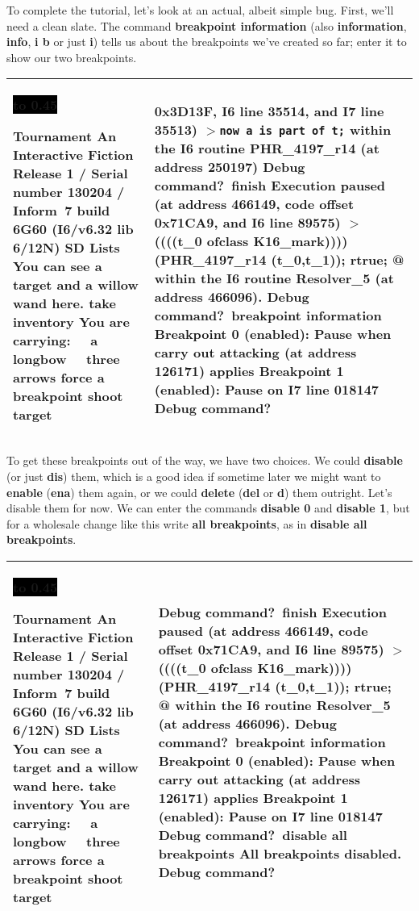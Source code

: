 \documentclass{book}
\newcommand{\n}{\hspace*{\fill}\newline}
\newcommand{\terp}[2]{\begin{center}\begin{tabular}{p{0.45\textwidth}|p{0.45\textwidth}}\midrule #1&#2\\\midrule\end{tabular}\end{center}}
\newcommand{\glkheading}[1]{\textbf{#1}}
\newcommand{\glkinput}[1]{\textbf{#1}}
\newcommand{\glkstatusline}[2]{\centerline{\colorbox{black}{\hbox to 0.45\textwidth{\textcolor{white}{#1\hfil #2}}}}}
\newcommand{\storyprompt}{\raisebox{1.5pt}{\(>\)}}
\newcommand{\cursor}{\raisebox{-1.5pt}{\RectangleThin}}
\newcommand{\markedindent}{\(>\)\qquad}
\begin{document}
To complete the tutorial, let's look at an actual, albeit simple bug.  First,
we'll need a clean slate.  The command \glkinput{breakpoint information} (also
\glkinput{information}, \glkinput{info}, \glkinput{i b} or just \glkinput{i})
tells us about the breakpoints we've created so far; enter it to show our two
breakpoints.

\terp{\glkstatusline{Lists}{0/2}\n
  \glkheading{Tournament}\n
  An Interactive Fiction\n
  Release 1 / Serial number 130204 / Inform~7 build 6G60 (I6/v6.32 lib 6/12N) SD\n
  \n
  \glkheading{Lists}\n
  You can see a target and a willow wand here.\n
  \n
  \storyprompt\glkinput{take inventory}\n
  You are carrying:\n
  \null\ \ a longbow\n
  \null\ \ three arrows\n
  \n
  \storyprompt\glkinput{force a breakpoint}\n
  \storyprompt\glkinput{shoot target}}{%
  0x3D13F, I6 line 35514, and I7 line 35513)\n
  \markedindent \lstinline{now a is part of t;}\n
  within the I6 routine PHR\_4197\_r14 (at address 250197)\n
  \n
  Debug command?\ \glkinput{finish}\n
  \n
  Execution paused (at address 466149, code offset 0x71CA9, and I6 line 89575)\n
  \markedindent \lstinline@if ((((t\_0 ofclass K16\_mark)))) { (PHR\_4197\_r14 (t\_0,t\_1)); rtrue; }@\n
  within the I6 routine Resolver\_5 (at address 466096).\n
  \n
  Debug command?\ \glkinput{breakpoint information}\n
  \n
  Breakpoint 0 (enabled): Pause when carry out attacking (at address 126171) applies\n
  Breakpoint 1 (enabled): Pause on I7 line 018147\n
  \n
  Debug command?\ \cursor}

To get these breakpoints out of the way, we have two choices.  We could
\glkinput{disable} (or just \glkinput{dis}) them, which is a good idea if
sometime later we might want to \glkinput{enable} (\glkinput{ena}) them again,
or we could \glkinput{delete} (\glkinput{del} or \glkinput{d}) them outright.
Let's disable them for now.  We can enter the commands \glkinput{disable 0} and
\glkinput{disable 1}, but for a wholesale change like this write \glkinput{all
  breakpoints}, as in \glkinput{disable all breakpoints}.

\terp{\glkstatusline{Lists}{0/2}\n
  \glkheading{Tournament}\n
  An Interactive Fiction\n
  Release 1 / Serial number 130204 / Inform~7 build 6G60 (I6/v6.32 lib 6/12N) SD\n
  \n
  \glkheading{Lists}\n
  You can see a target and a willow wand here.\n
  \n
  \storyprompt\glkinput{take inventory}\n
  You are carrying:\n
  \null\ \ a longbow\n
  \null\ \ three arrows\n
  \n
  \storyprompt\glkinput{force a breakpoint}\n
  \storyprompt\glkinput{shoot target}}{%
  \n
  Debug command?\ \glkinput{finish}\n
  \n
  Execution paused (at address 466149, code offset 0x71CA9, and I6 line 89575)\n
  \markedindent \lstinline@if ((((t\_0 ofclass K16\_mark)))) { (PHR\_4197\_r14 (t\_0,t\_1)); rtrue; }@\n
  within the I6 routine Resolver\_5 (at address 466096).\n
  \n
  Debug command?\ \glkinput{breakpoint information}\n
  \n
  Breakpoint 0 (enabled): Pause when carry out attacking (at address 126171) applies\n
  Breakpoint 1 (enabled): Pause on I7 line 018147\n
  \n
  Debug command?\ \glkinput{disable all breakpoints}\n
  \n
  All breakpoints disabled.\n
  \n
  Debug command?\ \cursor}
\end{document}
